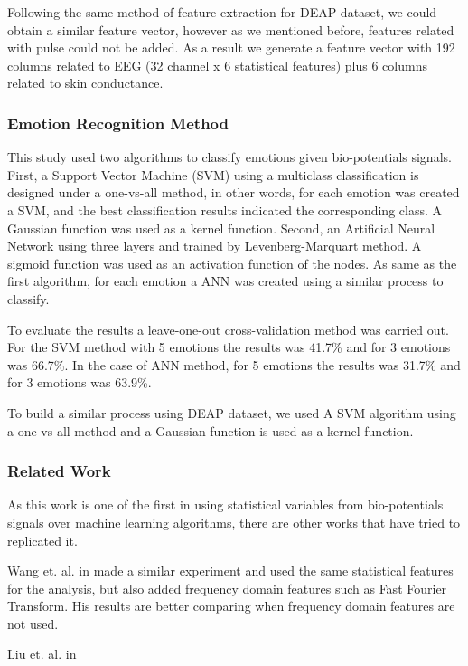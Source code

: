 \documentclass{sig-alternate}
\begin{document}
Following the same method of feature extraction for DEAP dataset, 
we could obtain a similar feature vector, however as we mentioned before, 
features related with pulse could not be added. As a result we generate 
a feature vector with 192 columns related to EEG (32 channel x 6 statistical 
features) plus 6 columns related to skin conductance.

\subsubsection{Emotion Recognition Method}

This study used two algorithms to classify emotions given bio-potentials signals.
First, a Support Vector Machine (SVM) using a multiclass classification is designed under 
a one-vs-all method, in other words, for each emotion was created a SVM, and the best
classification results indicated the corresponding class. A Gaussian function was used as a kernel function.
Second, an Artificial Neural Network using three layers and trained by Levenberg-Marquart method.
A sigmoid function was used as an activation function of the nodes. As same as the first algorithm,
for each emotion a ANN was created using a similar process to classify.

To evaluate the results a leave-one-out cross-validation method was carried out. 
For the SVM method with 5 emotions the results was 41.7\% and for 3 emotions was 66.7\%.
In the case of ANN method, for 5 emotions the results was 31.7\% and for 3 emotions was
63.9\%.   

To build a similar process using DEAP dataset, we used A SVM algorithm using a
one-vs-all method and a Gaussian function is used as a kernel function. 

\subsubsection{Related Work}

As this work is one of the first in using statistical variables from 
bio-potentials signals over machine learning algorithms, there are other works
that have tried to replicated it. 

Wang et. al. in \cite{wang2011} made a similar experiment
and used the same statistical features for the analysis, but also 
added frequency domain features such as Fast Fourier Transform. His
results are better comparing when frequency domain features are not used.

Liu et. al. in \cite{liu2013}
\end{document}
